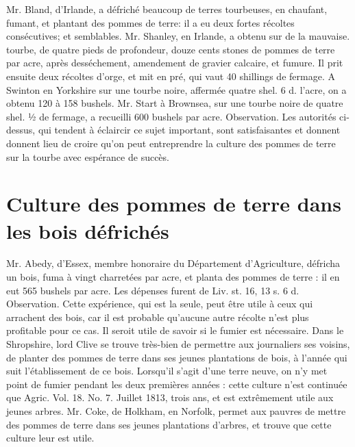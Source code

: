 Mr. Bland, d'Irlande, a défriché beaucoup de terres tourbeuses, en chaufant, fumant, et plantant des pommes de terre: il a eu deux fortes récoltes consécutives; et semblables.
Mr. Shanley, en Irlande, a obtenu sur de la mauvaise. tourbe, de quatre pieds de profondeur, douze cents stones de pommes de terre par acre, après desséchement, amendement de gravier calcaire, et fumure. Il prit ensuite deux récoltes d'orge, et mit en pré, qui vaut 40 shillings de fermage.
A Swinton en Yorkshire sur une tourbe noire, affermée quatre shel. 6 d. l'acre, on a obtenu 120 à 158 bushels.
Mr. Start à Brownsea, sur une tourbe noire de quatre shel. ½ de fermage, a recueilli 600 bushels par acre.
Observation. Les autorités ci-dessus, qui tendent à éclaircir ce sujet important, sont satisfaisantes et donnent\setcounter{page}{273} donnent lieu de croire qu'on peut entreprendre la culture des pommes de terre sur la tourbe avec espérance de succès.
\section{Culture des pommes de terre dans les bois défrichés}
Mr. Abedy, d'Essex, membre honoraire du Département d'Agriculture, défricha un bois, fuma à vingt charretées par acre, et planta des pommes de terre : il en eut 565 bushels par acre. Les dépenses furent de Liv. st. 16, 13 s. 6 d.
Observation.
Cette expérience, qui est la seule, peut être utile à ceux qui arrachent des bois, car il est probable qu'aucune autre récolte n'est plus profitable pour ce cas. Il seroit utile de savoir si le fumier est nécessaire.
Dans le Shropshire, lord Clive se trouve très-bien de permettre aux journaliers ses voisins, de planter des pommes de terre dans ses jeunes plantations de bois, à l'année qui suit l'établissement de ce bois. Lorsqu'il s'agit d'une terre neuve, on n'y met point de fumier pendant les deux premières années : cette culture n'est continuée que Agric. Vol. 18. No. 7. Juillet 1813,\setcounter{page}{274} trois ans, et est extrêmement utile aux jeunes arbres.
Mr. Coke, de Holkham, en Norfolk, permet aux pauvres de mettre des pommes de terre dans ses jeunes plantations d’arbres, et trouve que cette culture leur est utile.
